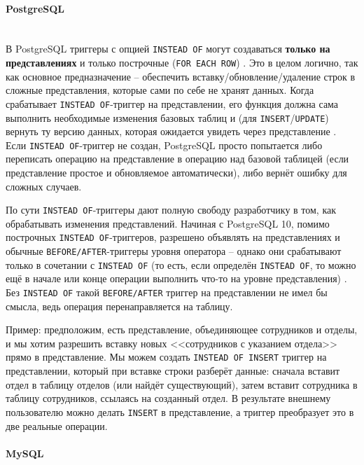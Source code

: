 \paragraph{\textbf{PostgreSQL}} ~\\

 В PostgreSQL триггеры с опцией \texttt{INSTEAD OF} могут создаваться \textbf{только на представлениях} и только построчные (\texttt{FOR EACH ROW}) \autocite{PostgreSQLdocc37}. Это в целом логично, так как основное предназначение – обеспечить вставку/обновление/удаление строк в сложные представления, которые сами по себе не хранят данных. Когда срабатывает \texttt{INSTEAD OF}-триггер на представлении, его функция должна сама выполнить необходимые изменения базовых таблиц и (для \texttt{INSERT}/\texttt{UPDATE}) вернуть ту версию данных, которая ожидается увидеть через представление \autocite{PostgreSQLdocc37}. Если \texttt{INSTEAD OF}-триггер не создан, PostgreSQL просто попытается либо переписать операцию на представление в операцию над базовой таблицей (если представление простое и обновляемое автоматически), либо вернёт ошибку для сложных случаев. 
 
 По сути \texttt{INSTEAD OF}-триггеры дают полную свободу разработчику в том, как обрабатывать изменения представлений. Начиная с PostgreSQL 10, помимо построчных \texttt{INSTEAD OF}-триггеров, разрешено объявлять на представлениях и обычные \texttt{BEFORE/AFTER}-триггеры уровня оператора – однако они срабатывают только в сочетании с \texttt{INSTEAD OF} (то есть, если определён \texttt{INSTEAD OF}, то можно ещё в начале или конце операции выполнить что-то на уровне представления) \autocite{PostgreSQLdocc37}. Без \texttt{INSTEAD OF} такой \texttt{BEFORE/AFTER} триггер на представлении не имел бы смысла, ведь операция перенаправляется на таблицу.

Пример: предположим, есть представление, объединяющее сотрудников и отделы, и мы хотим разрешить вставку новых <<сотрудников с указанием отдела>> прямо в представление. Мы можем создать \texttt{INSTEAD OF INSERT} триггер на представлении, который при вставке строки разберёт данные: сначала вставит отдел в таблицу отделов (или найдёт существующий), затем вставит сотрудника в таблицу сотрудников, ссылаясь на созданный отдел. В результате внешнему пользователю можно делать \texttt{INSERT} в представление, а триггер преобразует это в две реальные операции.

\paragraph{\textbf{MySQL}} ~\\

